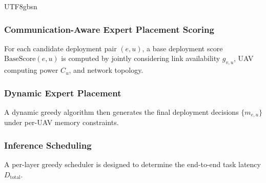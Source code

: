 \documentclass[journal]{IEEEtran}
\begin{document}
\begin{CJK*}{UTF8}{gbsn}
\subsubsection{Communication-Aware Expert Placement Scoring} For each candidate deployment pair \((e,u)\), a base deployment score \(\mathrm{BaseScore}(e,u)\) is computed by jointly considering link availability \(g_{v,u}\), UAV computing power \(C_u\), and network topology. 
\subsubsection{Dynamic Expert Placement} A dynamic greedy algorithm then generates the final deployment decisions \(\{m_{e,u}\}\) under per-UAV memory constraints.

\subsubsection{Inference Scheduling} A per-layer greedy scheduler is designed to determine the end-to-end task latency \(D_{\mathrm{total}}\).


\end{CJK*}
\end{document}
